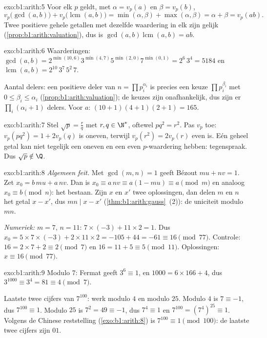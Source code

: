\begin{solution}{exo:b1:arith:5}
Voor elk  $p$ geldt, met $\alpha = v_p(a)$ en $\beta = v_p(b)$,
\[
v_p\bigl(\gcd(a,b)\bigr) + v_p\bigl(\operatorname{lcm}(a,b)\bigr)
= \min(\alpha, \beta) + \max(\alpha, \beta)
= \alpha + \beta = v_p(ab) .
\]
Twee positieve gehele getallen met dezelfde waardering in elk 
zijn gelijk (\cref{prop:b1:arith:valuation}), dus is
$\gcd(a,b)\operatorname{lcm}(a,b) = ab$.
\end{solution}

\begin{solution}{exo:b1:arith:6}
Waarderingen: $\gcd(a, b) = 2^{\min(10,6)} 3^{\min(4,7)} 5^{\min(2,0)}
7^{\min(0,1)} = 2^6\, 3^4 = 5184$ en $\operatorname{lcm}(a,b) = 2^{10}\,
3^7\, 5^2\, 7$.

Aantal delers: een positieve deler van $n = \prod p_i^{\alpha_i}$ is
precies een keuze $\prod p_i^{\beta_i}$ met $0 \leq \beta_i \leq
\alpha_i$ (\cref{prop:b1:arith:valuation}); de keuzes zijn onafhankelijk,
dus zijn er $\prod_i (\alpha_i + 1)$ delers. Voor $a$: $(10+1)(4+1)(2+1)
= 165$.
\end{solution}

\begin{solution}{exo:b1:arith:7}
Stel $\sqrt p = \frac rq$ met $r, q \in \N^*$, oftewel $p q^2 = r^2$. Pas
$v_p$ toe: $v_p(pq^2) = 1 + 2v_p(q)$ is oneven, terwijl $v_p(r^2) = 2
v_p(r)$ even is. Eén geheel getal kan niet tegelijk een oneven en een even
$p$-waardering hebben: tegenspraak. Dus $\sqrt p \notin \Q$.
\end{solution}

\begin{solution}{exo:b1:arith:8}
\emph{Algemeen feit.} Met $\gcd(m,n) = 1$ geeft Bézout $mu + nv = 1$. Zet
$x_0 = b\,mu + a\,nv$. Dan is $x_0 \equiv a\,nv \equiv a(1 - mu) \equiv a
\pmod m$ en analoog $x_0 \equiv b \pmod n$: het bestaan. Zijn $x$ en $x'$
twee oplossingen, dan delen $m$ en $n$ het getal $x - x'$, dus $mn \mid x
- x'$ (\cref{thm:b1:arith:gauss}~(2)): de uniciteit modulo $mn$.

\emph{Numeriek:} $m = 7$, $n = 11$: $7 \times (-3) + 11 \times 2 = 1$.
Dus $x_0 = 5 \times 7 \times (-3) + 2 \times 11 \times 2 = -105 + 44 =
-61 \equiv 16 \pmod{77}$. Controle: $16 = 2\times 7 + 2 \equiv 2 \pmod 7$
en $16 = 11 + 5 \equiv 5 \pmod{11}$. Oplossingen: $x \equiv 16 \pmod{77}$.
\end{solution}

\begin{solution}{exo:b1:arith:9}
Modulo $7$: Fermat geeft $3^6 \equiv 1$, en $1000 = 6 \times 166 + 4$,
dus $3^{1000} \equiv 3^4 = 81 \equiv 4 \pmod 7$.

Laatste twee cijfers van $7^{100}$: werk modulo $4$ en modulo $25$.
Modulo $4$ is $7 \equiv -1$, dus $7^{100} \equiv 1$. Modulo $25$ is $7^2
= 49 \equiv -1$, dus $7^4 \equiv 1$ en $7^{100} = (7^4)^{25} \equiv 1$.
Volgens de Chinese reststelling (\cref{exo:b1:arith:8}) is $7^{100}
\equiv 1 \pmod{100}$: de laatste twee cijfers zijn $01$.
\end{solution}


